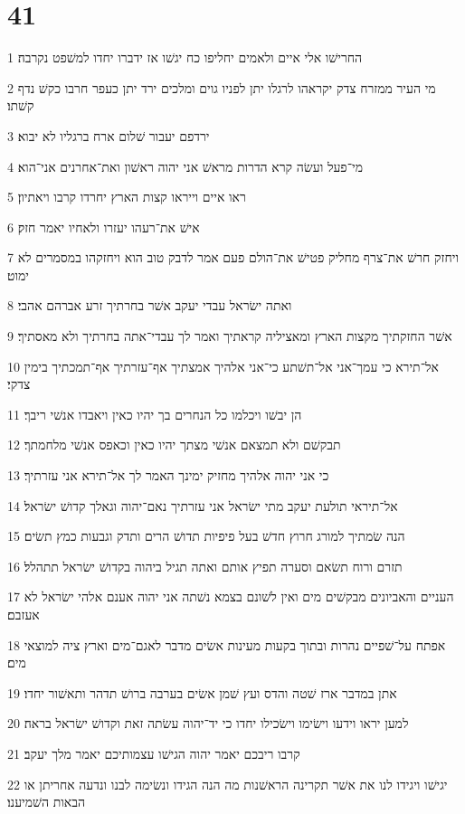 \chapter{41}

\par 1 החרישׁו אלי איים ולאמים יחליפו כח יגשׁו אז ידברו יחדו למשׁפט נקרבה׃
\par 2 מי העיר ממזרח צדק יקראהו לרגלו יתן לפניו גוים ומלכים ירד יתן כעפר חרבו כקשׁ נדף קשׁתו׃
\par 3 ירדפם יעבור שׁלום ארח ברגליו לא יבוא׃
\par 4 מי־פעל ועשׂה קרא הדרות מראשׁ אני יהוה ראשׁון ואת־אחרנים אני־הוא׃
\par 5 ראו איים וייראו קצות הארץ יחרדו קרבו ויאתיון׃
\par 6 אישׁ את־רעהו יעזרו ולאחיו יאמר חזק׃
\par 7 ויחזק חרשׁ את־צרף מחליק פטישׁ את־הולם פעם אמר לדבק טוב הוא ויחזקהו במסמרים לא ימוט׃
\par 8 ואתה ישׂראל עבדי יעקב אשׁר בחרתיך זרע אברהם אהבי׃
\par 9 אשׁר החזקתיך מקצות הארץ ומאציליה קראתיך ואמר לך עבדי־אתה בחרתיך ולא מאסתיך׃
\par 10 אל־תירא כי עמך־אני אל־תשׁתע כי־אני אלהיך אמצתיך אף־עזרתיך אף־תמכתיך בימין צדקי׃
\par 11 הן יבשׁו ויכלמו כל הנחרים בך יהיו כאין ויאבדו אנשׁי ריבך׃
\par 12 תבקשׁם ולא תמצאם אנשׁי מצתך יהיו כאין וכאפס אנשׁי מלחמתך׃
\par 13 כי אני יהוה אלהיך מחזיק ימינך האמר לך אל־תירא אני עזרתיך׃
\par 14 אל־תיראי תולעת יעקב מתי ישׂראל אני עזרתיך נאם־יהוה וגאלך קדושׁ ישׂראל׃
\par 15 הנה שׂמתיך למורג חרוץ חדשׁ בעל פיפיות תדושׁ הרים ותדק וגבעות כמץ תשׂים׃
\par 16 תזרם ורוח תשׂאם וסערה תפיץ אותם ואתה תגיל ביהוה בקדושׁ ישׂראל תתהלל׃
\par 17 העניים והאביונים מבקשׁים מים ואין לשׁונם בצמא נשׁתה אני יהוה אענם אלהי ישׂראל לא אעזבם׃
\par 18 אפתח על־שׁפיים נהרות ובתוך בקעות מעינות אשׂים מדבר לאגם־מים וארץ ציה למוצאי מים׃
\par 19 אתן במדבר ארז שׁטה והדס ועץ שׁמן אשׂים בערבה ברושׁ תדהר ותאשׁור יחדו׃
\par 20 למען יראו וידעו וישׂימו וישׂכילו יחדו כי יד־יהוה עשׂתה זאת וקדושׁ ישׂראל בראה׃
\par 21 קרבו ריבכם יאמר יהוה הגישׁו עצמותיכם יאמר מלך יעקב׃
\par 22 יגישׁו ויגידו לנו את אשׁר תקרינה הראשׁנות מה הנה הגידו ונשׂימה לבנו ונדעה אחריתן או הבאות השׁמיענו׃
